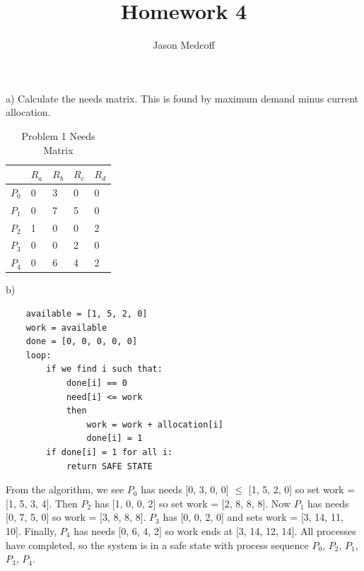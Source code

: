 \documentclass{amsart}
\title{Homework 4}
\author{Jason Medcoff}
\date{}
\begin{document}
	\maketitle
	
	a) Calculate the needs matrix. This is found by maximum demand minus current allocation.
	\begin{table}[h]
		\centering
		\caption{Problem 1 Needs Matrix}
		\label{needs}
		\begin{tabular}{l|llll}
			& $R_a$ & $R_b$ & $R_c$ & $R_d$  \\ \hline
			$P_0$ & 0     & 3     & 0     & 0     \\
			$P_1$ & 0     & 7     & 5     & 0     \\
			$P_2$ & 1     & 0     & 0     & 2     \\
			$P_3$ & 0     & 0     & 2     & 0     \\
			$P_4$ & 0     & 6     & 4     & 2    
		\end{tabular}
	\end{table}

	b)
	\begin{lstlisting}
	available = [1, 5, 2, 0]
	work = available
	done = [0, 0, 0, 0, 0]
	loop:
	    if we find i such that:
	        done[i] == 0
	        need[i] <= work
	        then
	            work = work + allocation[i]
	            done[i] = 1
	    if done[i] = 1 for all i:
	        return SAFE STATE
	\end{lstlisting}
	
	
	From the algorithm, we see $P_0$ has needs [0, 3, 0, 0] $\leq$ [1, 5, 2, 0] so set work = [1, 5, 3, 4]. Then $P_2$ has [1, 0, 0, 2] so set work = [2, 8, 8, 8]. Now $P_1$ has needs [0, 7, 5, 0] so work = [3, 8, 8, 8]. $P_3$ has [0, 0, 2, 0] and sets work = [3, 14, 11, 10]. Finally, $P_4$ has needs [0, 6, 4, 2] so work ends at [3, 14, 12, 14]. All processes have completed, so the system is in a safe state with process sequence $P_0$, $P_2$, $P_1$, $P_3$, $P_4$.
	
	
\end{document}
